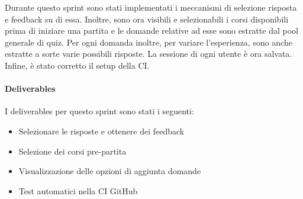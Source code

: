 Durante questo sprint sono stati implementati i meccanismi di selezione risposta e feedback su di essa. Inoltre, sono ora visibili e selezionabili i corsi disponibili prima di iniziare una partita e le domande relative ad esse sono estratte dal pool generale di quiz. Per ogni domanda inoltre, per variare l'esperienza, sono anche estratte a sorte varie possibili risposte. La sessione di ogni utente è ora salvata. Infine, è stato corretto il setup della CI.
\paragraph{Deliverables} 
I deliverables per questo sprint sono stati i seguenti:
\begin{itemize}
    \item Selezionare le risposte e ottenere dei feedback
    \item Selezione dei corsi pre-partita
    \item Visualizzazione delle opzioni di aggiunta domande
    \item Test automatici nella CI GitHub
\end{itemize}
